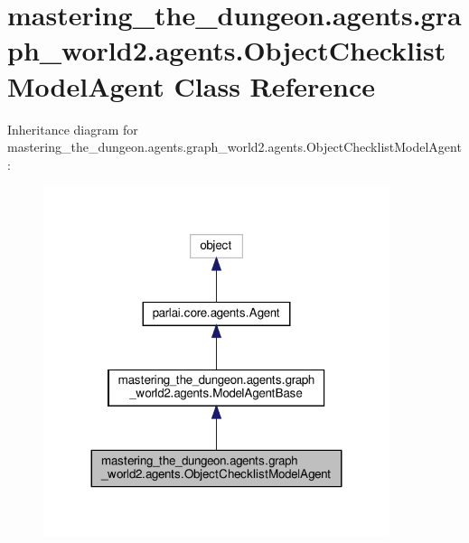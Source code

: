 \hypertarget{classmastering__the__dungeon_1_1agents_1_1graph__world2_1_1agents_1_1ObjectChecklistModelAgent}{}\section{mastering\+\_\+the\+\_\+dungeon.\+agents.\+graph\+\_\+world2.\+agents.\+Object\+Checklist\+Model\+Agent Class Reference}
\label{classmastering__the__dungeon_1_1agents_1_1graph__world2_1_1agents_1_1ObjectChecklistModelAgent}


Inheritance diagram for mastering\+\_\+the\+\_\+dungeon.\+agents.\+graph\+\_\+world2.\+agents.\+Object\+Checklist\+Model\+Agent\+:
\nopagebreak
\begin{figure}[H]
\begin{center}
\leavevmode
\includegraphics[width=287pt]{classmastering__the__dungeon_1_1agents_1_1graph__world2_1_1agents_1_1ObjectChecklistModelAgent__inherit__graph}
\end{center}
\end{figure}



